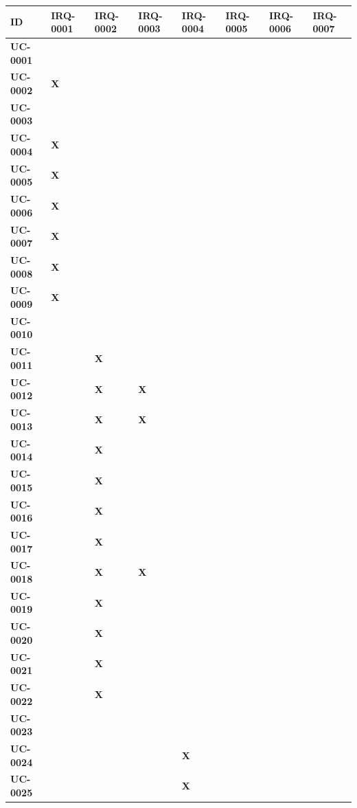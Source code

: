 \begin{table}[H]
\centering
\small
\begin{tabular}{p{1.5cm}p{0.5cm}p{0.5cm}p{0.5cm}p{0.5cm}p{0.5cm}p{0.5cm}p{0.5cm}}
\hline
\textbf{ID} & \textbf{IRQ-0001} & \textbf{IRQ-0002} & \textbf{IRQ-0003} & \textbf{IRQ-0004} & \textbf{IRQ-0005} & \textbf{IRQ-0006} & \textbf{IRQ-0007} \\
\hline
\textbf{UC-0001} &  &  &  &  &  &  &  \\
\textbf{UC-0002} & \textbf{X} &  &  &  &  &  &  \\
\textbf{UC-0003} &  &  &  &  &  &  &  \\
\textbf{UC-0004} & \textbf{X} &  &  &  &  &  &  \\
\textbf{UC-0005} & \textbf{X} &  &  &  &  &  &  \\
\textbf{UC-0006} & \textbf{X} &  &  &  &  &  &  \\
\textbf{UC-0007} & \textbf{X} &  &  &  &  &  &  \\
\textbf{UC-0008} & \textbf{X} &  &  &  &  &  &  \\
\textbf{UC-0009} & \textbf{X} &  &  &  &  &  &  \\
\textbf{UC-0010} &  &  &  &  &  &  &  \\
\textbf{UC-0011} &  & \textbf{X} &  &  &  &  &  \\
\textbf{UC-0012} &  & \textbf{X} & \textbf{X} &  &  &  &  \\
\textbf{UC-0013} &  & \textbf{X} & \textbf{X} &  &  &  &  \\
\textbf{UC-0014} &  & \textbf{X} &  &  &  &  &  \\
\textbf{UC-0015} &  & \textbf{X} &  &  &  &  &  \\
\textbf{UC-0016} &  & \textbf{X} &  &  &  &  &  \\
\textbf{UC-0017} &  & \textbf{X} &  &  &  &  &  \\
\textbf{UC-0018} &  & \textbf{X} & \textbf{X} &  &  &  &  \\
\textbf{UC-0019} &  & \textbf{X} &  &  &  &  &  \\
\textbf{UC-0020} &  & \textbf{X} &  &  &  &  &  \\
\textbf{UC-0021} &  & \textbf{X} &  &  &  &  &  \\
\textbf{UC-0022} &  & \textbf{X} &  &  &  &  &  \\
\textbf{UC-0023} &  &  &  &  &  &  &  \\
\textbf{UC-0024} &  &  &  & \textbf{X} &  &  &  \\
\textbf{UC-0025} &  &  &  & \textbf{X} &  &  &  \\

\end{tabular}
\end{table}
